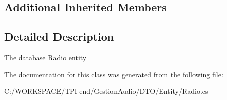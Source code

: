 \subsection*{Additional Inherited Members}


\subsection{Detailed Description}
The database \hyperlink{class_d_t_o_1_1_entity_1_1_radio}{Radio} entity 



The documentation for this class was generated from the following file\+:\begin{DoxyCompactItemize}
\item 
C\+:/\+W\+O\+R\+K\+S\+P\+A\+C\+E/\+T\+P\+I-\/end/\+Gestion\+Audio/\+D\+T\+O/\+Entity/Radio.\+cs\end{DoxyCompactItemize}
